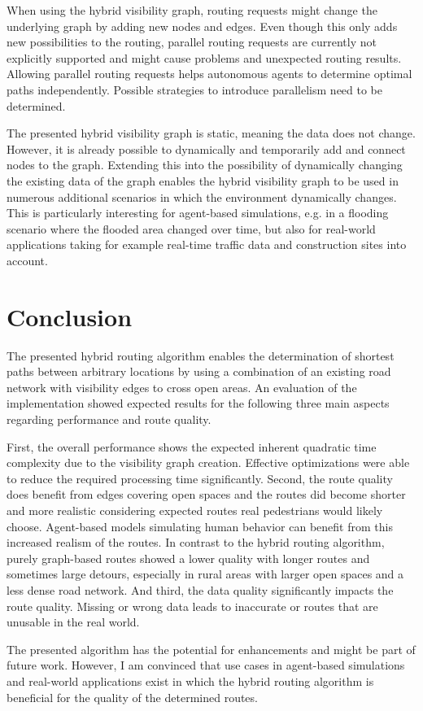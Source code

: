		When using the hybrid visibility graph, routing requests might change the underlying graph by adding new nodes and edges.
		Even though this only adds new possibilities to the routing, parallel routing requests are currently not explicitly supported and might cause problems and unexpected routing results.
		Allowing parallel routing requests helps autonomous agents to determine optimal paths independently.
		Possible strategies to introduce parallelism need to be determined.
		
		The presented hybrid visibility graph is static, meaning the data does not change.
		However, it is already possible to dynamically and temporarily add and connect nodes to the graph.
		Extending this into the possibility of dynamically changing the existing data of the graph enables the hybrid visibility graph to be used in numerous additional scenarios in which the environment dynamically changes.
		This is particularly interesting for agent-based simulations, e.g. in a flooding scenario where the flooded area changed over time, but also for real-world applications taking for example real-time traffic data and construction sites into account.
		
\section{Conclusion}

	The presented hybrid routing algorithm enables the determination of shortest paths between arbitrary locations by using a combination of an existing road network with visibility edges to cross open areas.
	An evaluation of the implementation showed expected results for the following three main aspects regarding performance and route quality.
	
	First, the overall performance shows the expected inherent quadratic time complexity due to the visibility graph creation.
	Effective optimizations were able to reduce the required processing time significantly.
	Second, the route quality does benefit from edges covering open spaces and the routes did become shorter and more realistic considering expected routes real pedestrians would likely choose.
	Agent-based models simulating human behavior can benefit from this increased realism of the routes.
	In contrast to the hybrid routing algorithm, purely graph-based routes showed a lower quality with longer routes and sometimes large detours, especially in rural areas with larger open spaces and a less dense road network.
	And third, the data quality significantly impacts the route quality.
	Missing or wrong data leads to inaccurate or routes that are unusable in the real world.
	
	The presented algorithm has the potential for enhancements and might be part of future work.
	However, I am convinced that use cases in agent-based simulations and real-world applications exist in which the hybrid routing algorithm is beneficial for the quality of the determined routes.